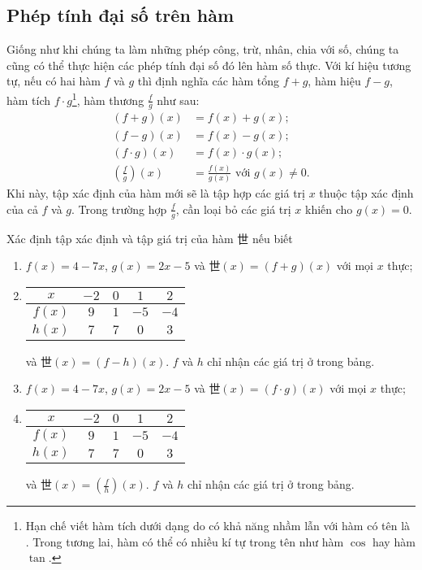 \subsection{Phép tính đại số trên hàm}

Giống như khi chúng ta làm những phép công, trừ, nhân, chia với số, chúng ta cũng có thể thực hiện các phép tính đại số đó lên hàm số thực. Với kí hiệu tương tự, nếu có hai hàm $f$ và $g$ thì định nghĩa các hàm tổng $f+g$, hàm hiệu $f-g$, hàm tích $f\cdot g$\footnote{Hạn chế viết hàm tích dưới dạng  do có khả năng nhầm lẫn với hàm có tên là . Trong tương lai, hàm có thể có nhiều kí tự trong tên như hàm $\cos$ hay hàm $\tan$.}, hàm thương $\frac{f}{g}$ như sau:
\begin{align*}
   (f + g)(x) &= f(x) + g(x);\\
   (f - g)(x) &= f(x) - g(x);\\
   (f \cdot g)(x) &= f(x) \cdot g(x);\\
   \left(\frac{f}{g}\right)(x) &= \frac{f(x)}{g(x)} \text{ với } g(x) \neq 0.
\end{align*}
Khi này, tập xác định của hàm mới sẽ là tập hợp các giá trị $x$ thuộc tập xác định của cả $f$ và $g$. Trong trường hợp $\frac{f}{g}$, cần loại bỏ các giá trị $x$ khiến cho $g(x) = 0$.

\def \theF {\textit{世}}

\exercise Xác định tập xác định và tập giá trị của hàm $\theF$ nếu biết
\begin{enumerate}
   \item $f(x) = 4 - 7x$, $g(x) = 2x - 5$ và $\theF(x) = (f + g)(x)$ với mọi $x$ thực;
   \item 
   \begin{tabular}{|c|c|c|c|c|}
      \hline
      $x$ & $-2$ & $0$ & $1$ & $2$ \\
      \hline
      $f(x)$ & $9$ & $1$ & $-5$ & $-4$ \\
      \hline
      $h(x)$ & $7$ & $7$ & $0$ & $3$ \\
      \hline
   \end{tabular} và $\theF(x) = (f - h)(x)$. $f$ và $h$ chỉ nhận các giá trị ở trong bảng.
   \item $f(x) = 4 - 7x$, $g(x) = 2x - 5$ và $\theF(x) = (f \cdot g)(x)$ với mọi $x$ thực;
   \item 
   \begin{tabular}{|c|c|c|c|c|}
      \hline
      $x$ & $-2$ & $0$ & $1$ & $2$ \\
      \hline
      $f(x)$ & $9$ & $1$ & $-5$ & $-4$ \\
      \hline
      $h(x)$ & $7$ & $7$ & $0$ & $3$ \\
      \hline
   \end{tabular} và $\theF(x) = \left(\frac{f}{h}\right)(x)$. $f$ và $h$ chỉ nhận các giá trị ở trong bảng.
\end{enumerate}

